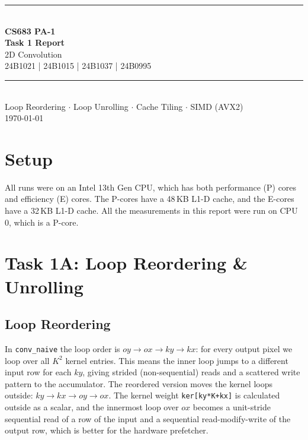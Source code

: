 \documentclass[11pt]{article}
\begin{document}
\begin{titlepage}
    \centering
    \vspace*{2.2cm}
    {\color{accent}\rule{0.5\textwidth}{1.2pt}}\\[0.6cm]
    {\Huge\bfseries\color{primary} CS683 PA-1}\\[0.4cm]
    {\LARGE\bfseries\color{primary} Task 1 Report}\\[0.3cm]
    {\Large 2D Convolution}\\[0.6cm]
    {\large 24B1021 | 24B1015 | 24B1037 | 24B0995}\\[0.6cm]
    {\color{accent}\rule{0.5\textwidth}{1.2pt}}\\[1.4cm]

    {\large Loop Reordering \(\cdot\) Loop Unrolling \(\cdot\) Cache Tiling \(\cdot\) SIMD (AVX2)}\\[2cm]

    \vfill
    {\large \today}
\end{titlepage}

\tableofcontents
\newpage

\section*{Setup}

All runs were on an Intel 13th Gen CPU, which has both
performance (P) cores and efficiency (E) cores. The P-cores have a 48\,KB
L1-D cache, and the E-cores have a 32\,KB L1-D cache. All the measurements
in this report were run on CPU 0, which is a P-core.

\section{Task 1A: Loop Reordering \& Unrolling}

\subsection{Loop Reordering}

In \texttt{conv\_naive} the loop order is $oy \to ox \to ky \to kx$: for every
output pixel we loop over all $K^2$ kernel entries. This means the inner loop
jumps to a different input row for each $ky$, giving strided (non-sequential)
reads and a scattered write pattern to the accumulator. The reordered version
moves the kernel loops outside: $ky \to kx \to oy \to ox$. The kernel weight
\texttt{ker[ky*K+kx]} is calculated outside as a scalar, and the innermost loop over
$ox$ becomes a unit-stride sequential read of a row of the input and a
sequential read-modify-write of the output row, which is better for the
hardware prefetcher.
\end{document}
